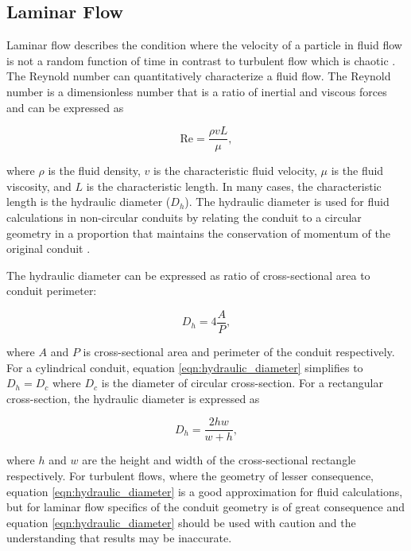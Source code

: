 \subsection*{Laminar Flow}
\par Laminar flow describes the condition where the velocity of a particle in fluid flow is not a random function of time in contrast to turbulent flow which is chaotic \cite{pamb}. The Reynold number can quantitatively characterize a fluid flow. The Reynold number is a dimensionless number that is a ratio of inertial and viscous forces and can be expressed as

\begin{equation}
    \text{Re} = \frac{\rho v L}{\mu},
\end{equation}

\noindent where $\rho$ is the fluid density, $v$ is the characteristic fluid velocity, $\mu$ is the fluid viscosity, and $L$ is the characteristic length. In many cases, the characteristic length is the hydraulic diameter ($D_h$). The hydraulic diameter is used for fluid calculations in non-circular conduits by relating the conduit to a circular geometry in a proportion that maintains the conservation of momentum of the original conduit \cite{PAMB}.

\par The hydraulic diameter can be expressed as ratio of cross-sectional area to conduit perimeter:

\begin{equation}
    D_h = 4 \frac{A}{P},
    \label{eqn:hydraulic_diameter}
\end{equation}

\noindent where $A$ and $P$ is cross-sectional area and perimeter of the conduit respectively. For a cylindrical conduit, equation \ref{eqn:hydraulic_diameter} simplifies to $D_h = D_c$ where $D_c$ is the diameter of circular cross-section. For a rectangular cross-section, the hydraulic diameter is expressed as 

\begin{equation}
    D_h = \frac{2hw}{w+h},
\end{equation}

\noindent where $h$ and $w$ are the height and width of the cross-sectional rectangle respectively. For turbulent flows, where the geometry of lesser consequence, equation \ref{eqn:hydraulic_diameter} is a good approximation for fluid calculations, but for laminar flow specifics of the conduit geometry is of great consequence and equation \ref{eqn:hydraulic_diameter} should be used with caution and the understanding that results may be inaccurate. 

